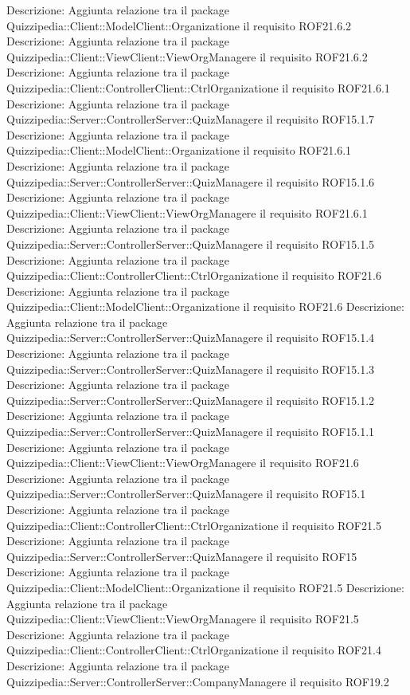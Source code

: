 Descrizione: Aggiunta relazione tra il package Quizzipedia::Client::ModelClient::Organizatione il requisito ROF21.6.2 
Descrizione: Aggiunta relazione tra il package Quizzipedia::Client::ViewClient::ViewOrgManagere il requisito ROF21.6.2 
Descrizione: Aggiunta relazione tra il package Quizzipedia::Client::ControllerClient::CtrlOrganizatione il requisito ROF21.6.1 
Descrizione: Aggiunta relazione tra il package Quizzipedia::Server::ControllerServer::QuizManagere il requisito ROF15.1.7 
Descrizione: Aggiunta relazione tra il package Quizzipedia::Client::ModelClient::Organizatione il requisito ROF21.6.1 
Descrizione: Aggiunta relazione tra il package Quizzipedia::Server::ControllerServer::QuizManagere il requisito ROF15.1.6 
Descrizione: Aggiunta relazione tra il package Quizzipedia::Client::ViewClient::ViewOrgManagere il requisito ROF21.6.1 
Descrizione: Aggiunta relazione tra il package Quizzipedia::Server::ControllerServer::QuizManagere il requisito ROF15.1.5 
Descrizione: Aggiunta relazione tra il package Quizzipedia::Client::ControllerClient::CtrlOrganizatione il requisito ROF21.6 
Descrizione: Aggiunta relazione tra il package Quizzipedia::Client::ModelClient::Organizatione il requisito ROF21.6 
Descrizione: Aggiunta relazione tra il package Quizzipedia::Server::ControllerServer::QuizManagere il requisito ROF15.1.4 
Descrizione: Aggiunta relazione tra il package Quizzipedia::Server::ControllerServer::QuizManagere il requisito ROF15.1.3 
Descrizione: Aggiunta relazione tra il package Quizzipedia::Server::ControllerServer::QuizManagere il requisito ROF15.1.2 
Descrizione: Aggiunta relazione tra il package Quizzipedia::Server::ControllerServer::QuizManagere il requisito ROF15.1.1 
Descrizione: Aggiunta relazione tra il package Quizzipedia::Client::ViewClient::ViewOrgManagere il requisito ROF21.6 
Descrizione: Aggiunta relazione tra il package Quizzipedia::Server::ControllerServer::QuizManagere il requisito ROF15.1 
Descrizione: Aggiunta relazione tra il package Quizzipedia::Client::ControllerClient::CtrlOrganizatione il requisito ROF21.5 
Descrizione: Aggiunta relazione tra il package Quizzipedia::Server::ControllerServer::QuizManagere il requisito ROF15 
Descrizione: Aggiunta relazione tra il package Quizzipedia::Client::ModelClient::Organizatione il requisito ROF21.5 
Descrizione: Aggiunta relazione tra il package Quizzipedia::Client::ViewClient::ViewOrgManagere il requisito ROF21.5 
Descrizione: Aggiunta relazione tra il package Quizzipedia::Client::ControllerClient::CtrlOrganizatione il requisito ROF21.4 
Descrizione: Aggiunta relazione tra il package Quizzipedia::Server::ControllerServer::CompanyManagere il requisito ROF19.2 
